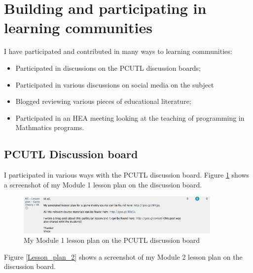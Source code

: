 \documentclass[a4paper,12pt]{article}
\begin{document}
\section{Building and participating in learning communities}

I have participated and contributed in many ways to learning communities:

\begin{itemize}
    \item Participated in discussions on the PCUTL discussion boards;
    \item Participated in various discussions on social media on the subject
    \item Blogged reviewing various pieces of educational literature;
    \item Participated in an HEA meeting looking at the teaching of programming in Mathmatics programs.
\end{itemize}

\subsection{PCUTL Discussion board}

I participated in various ways with the PCUTL discussion board. Figure \ref{Lesson_plan_1} shows a screenshot of my Module 1 lesson plan on the discussion board.\\

\begin{figure}[htdp]
    \begin{center}
        \includegraphics[width=10cm]{./images/Lesson_plan_1}
    \end{center}
    \caption{My Module 1 lesson plan on the PCUTL discussion board}
    \label{Lesson_plan_1}
\end{figure}

Figure \ref{Lesson_plan_2} shows a screenshot of my Module 2 lesson plan on the discussion board.\\
\end{document}

